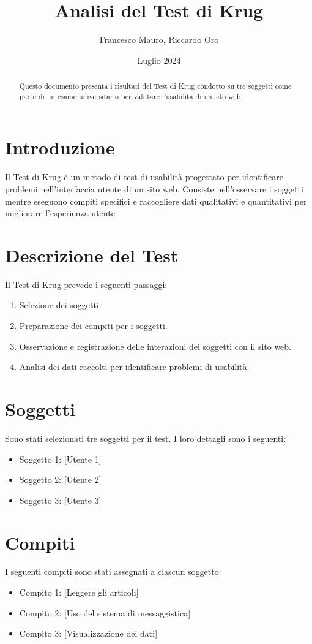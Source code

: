\documentclass[a4paper,12pt]{article}
\title{Analisi del Test di Krug}
\author{Francesco Mauro, Riccardo Oro}
\date{Luglio 2024}
\begin{document}
\maketitle

\begin{abstract}
Questo documento presenta i risultati del Test di Krug condotto su tre soggetti come parte di un esame universitario per valutare l'usabilità di un sito web.
\end{abstract}

\tableofcontents

\newpage

\section{Introduzione}
Il Test di Krug è un metodo di test di usabilità progettato per identificare problemi nell'interfaccia utente di un sito web. Consiste nell'osservare i soggetti mentre eseguono compiti specifici e raccogliere dati qualitativi e quantitativi per migliorare l'esperienza utente.

\section{Descrizione del Test}
Il Test di Krug prevede i seguenti passaggi:
\begin{enumerate}
    \item Selezione dei soggetti.
    \item Preparazione dei compiti per i soggetti.
    \item Osservazione e registrazione delle interazioni dei soggetti con il sito web.
    \item Analisi dei dati raccolti per identificare problemi di usabilità.
\end{enumerate}

\section{Soggetti}
Sono stati selezionati tre soggetti per il test. I loro dettagli sono i seguenti:
\begin{itemize}
    \item Soggetto 1: [Utente 1]
    \item Soggetto 2: [Utente 2]
    \item Soggetto 3: [Utente 3]
\end{itemize}

\section{Compiti}
I seguenti compiti sono stati assegnati a ciascun soggetto:
\begin{itemize}
    \item Compito 1: [Leggere gli articoli]
    \item Compito 2: [Uso del sistema di messaggistica]
    \item Compito 3: [Visualizzazione dei dati]
\end{itemize}
\end{document}
